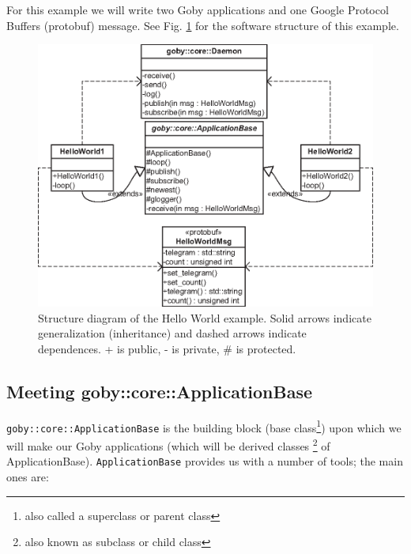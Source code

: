 \documentclass[11pt, letterpaper]{article}
\begin{document}
For this example we will write two Goby applications and one Google Protocol Buffers (protobuf) message. See Fig. \ref{fig:hellow_world_structure} for the software structure of this example.

\begin{figure}
\centering
\includegraphics[scale=0.9]{hello_world_structure}
\caption{Structure diagram of the Hello World example. Solid arrows indicate generalization (inheritance) and dashed arrows indicate dependences. + is public, - is private, \# is protected.}
\label{fig:hellow_world_structure}
\end{figure}

\subsection{Meeting goby::core::ApplicationBase}

\texttt{goby::core::ApplicationBase} is the building block (base class\footnote{also called a superclass or parent class}) upon which we will make our Goby applications (which will be derived classes \footnote{also known as subclass or child class} of ApplicationBase). \texttt{ApplicationBase} provides us with a number of tools; the main ones are:
\end{document}
